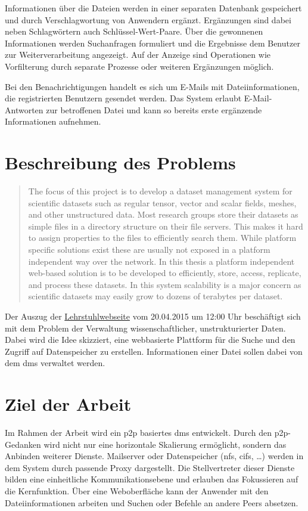 \documentclass[oneside, ngerman, toc=bibliography,bibliography=totoc,listof=entryprefix, open=right,numbers=noenddot,fontsize=12pt]{scrbook}
\begin{document}
Informationen über die Dateien werden in einer separaten Datenbank gespeichert und durch Verschlagwortung von Anwendern ergänzt. Ergänzungen sind dabei neben Schlagwörtern auch Schlüssel-Wert-Paare. Über die gewonnenen Informationen werden Suchanfragen formuliert und die Ergebnisse dem Benutzer zur Weiterverarbeitung angezeigt. Auf der Anzeige sind Operationen wie Vorfilterung durch separate Prozesse oder weiteren Ergänzungen möglich.

Bei den Benachrichtigungen handelt es sich um E-Mails mit Dateiinformationen, die registrierten Benutzern gesendet werden. Das System erlaubt E-Mail-Antworten zur betroffenen Datei und kann so bereits erste ergänzende Informationen aufnehmen.


\section{Beschreibung des Problems}


\begin{quote}
The focus of this project is to develop a dataset management system for scientific datasets such as regular tensor, vector and scalar fields, meshes, and other unstructured data.
Most research groups store their datasets as simple files in a directory structure on their file servers. This makes it hard to assign properties to the files to efficiently search them. While platform specific solutions exist these are usually not exposed in a platform independent way over the network.
In this thesis a platform independent web-based solution is to be developed to efficiently, store, access, replicate, and process these datasets. In this system scalability is a major concern as scientific datasets may easily grow to dozens of terabytes per dataset. 
\end{quote}


Der Auszug der \href{http://hpc.uni-due.de/theses.html}{Lehrstuhlwebseite} vom 20.04.2015 um 12:00 Uhr beschäftigt sich mit dem Problem der Verwaltung wissenschaftlicher, unstrukturierter Daten. Dabei wird die Idee skizziert, eine webbasierte Plattform für die Suche und den Zugriff auf Datenspeicher zu erstellen. Informationen einer Datei sollen dabei von dem  \acrfull{dms} verwaltet werden.

\section{Ziel der Arbeit}
Im Rahmen der Arbeit wird ein  \acrfull{p2p}  basiertes \acrshort{dms} entwickelt. Durch den \acrshort{p2p}-Gedanken wird nicht nur eine horizontale Skalierung ermöglicht, sondern das Anbinden weiterer Dienste. Mailserver oder Datenspeicher (\acrfull{nfs}, \acrfull{cifs}, \ldots) werden in dem System durch passende Proxy dargestellt. Die Stellvertreter dieser Dienste bilden eine einheitliche Kommunikationsebene \cite{coulouris2002verteilte} und erlauben das Fokussieren auf die Kernfunktion. Über eine Weboberfläche kann der Anwender mit den Dateiinformationen arbeiten und Suchen oder Befehle an andere Peers absetzen.
\end{document}
